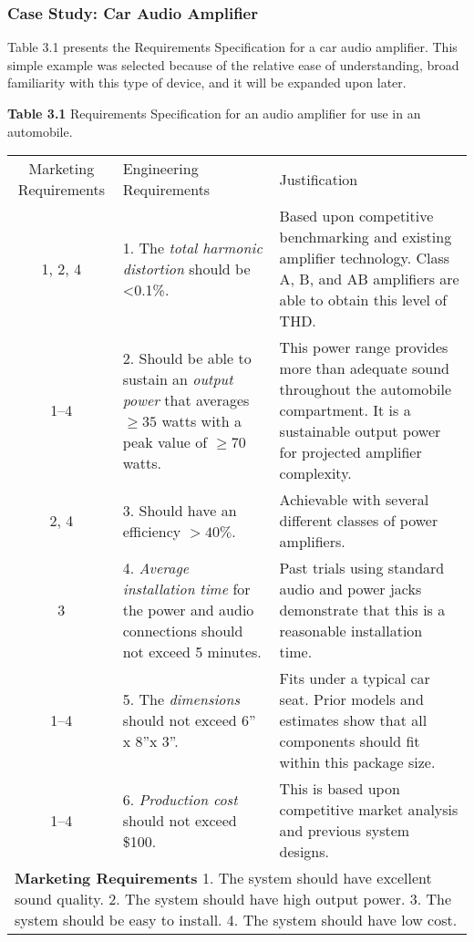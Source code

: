 \subsubsection{Case Study: Car Audio
Amplifier}\label{case-study-car-audio-amplifier}

Table 3.1 presents the Requirements Specification for a car audio
amplifier. This simple example was selected because of the relative ease
of understanding, broad familiarity with this type of device, and it
will be expanded upon later.

\textbf{Table 3.1} Requirements Specification for an audio amplifier for
use in an automobile.

\begin{table}
\centering
\begin{tabular}{ |c|l|l|} 
\hline
\rowcolor{Gray}
Marketing Requirements & Engineering Requirements & Justification \\
                           
1, 2, 4 &
1.  The \emph{total harmonic distortion} should be \textless0.1\%. &
Based upon competitive benchmarking and existing
amplifier technology. Class A, B, and AB amplifiers are able to obtain
this level of THD. \\

1--4 & 
2.   Should be able to sustain an \emph{output power} that averages $\ge 35$
  watts with a peak value of $\ge 70$ watts. & 
This power range provides more than adequate sound
throughout the automobile compartment. It is a sustainable output power
for projected amplifier complexity. \\

2, 4 & 
3. Should have an efficiency $> 40\%$. &
Achievable with several different classes of power amplifiers. \\

3 & 
4.   \emph{Average installation time} for the power and audio connections
  should not exceed 5 minutes. &
Past trials using standard audio and power jacks
demonstrate that this is a reasonable installation time. \\

1--4 & 
5.  The \emph{dimensions} should not exceed 6'' x 8''x 3''. &
Fits under a typical car seat. Prior models and
estimates show that all components should fit within this package
size. \\

1--4 & 
6.  \emph{Production cost} should not exceed \$100. &
This is based upon competitive market analysis and previous system designs. \\

\multicolumn{3}{l}{
\textbf{Marketing Requirements}
1.  The system should have excellent sound quality.
2.  The system should have high output power.
3.  The system should be easy to install.
4.   The system should have low cost.
}
\end{tabular}
\end{table}

